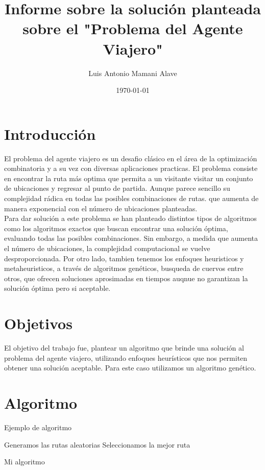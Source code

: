 \documentclass{article}
\title{Informe sobre la solución planteada sobre el "Problema del Agente Viajero"}
\author{Luis Antonio Mamani Alave}
\date{\today}
\begin{document}
\maketitle

\section{Introducción}
El problema del agente viajero es un desafio clásico en el área de la optimización combinatoria y a su vez con diversas aplicaciones practicas. El problema consiste en encontrar la ruta más  optima que permita a un visitante visitar un conjunto de ubicaciones y regresar al punto de partida. Aunque parece sencillo su complejidad rádica en todas las posibles combinaciones de rutas. que aumenta de manera exponencial con el número de ubicaciones planteadas. \\
Para dar solución a este problema se han planteado distintos tipos de algoritmos como los algoritmos exactos que buscan encontrar una solución óptima, evaluando todas las posibles combinaciones. Sin embargo, a medida que aumenta el número de ubicaciones, la complejidad computacional se vuelve desproporcionada. Por otro lado, tambien tenemos los enfoques heuristicos y metaheuristicos, a través de algoritmos genéticos, busqueda de cuervos entre otros, que ofrecen soluciones aprosimadas en tiempos auqnue no garantizan la solución óptima pero si aceptable. 

\section{Objetivos}
El objetivo del trabajo fue, plantear un algoritmo que brinde una solución al problema del agente viajero, utilizando enfoques heurísticos que nos permiten obtener una solución aceptable. Para este caso utilizamos un algoritmo genético.
\newpage
\section{Algoritmo}

\begin{algorithm}[h]
  \caption{Ejemplo de algoritmo}
  Generamos las rutas aleatorias\;
  Seleccionamos la mejor ruta\;
  \caption{Mi algoritmo}
  \end{algorithm}
\end{document}
